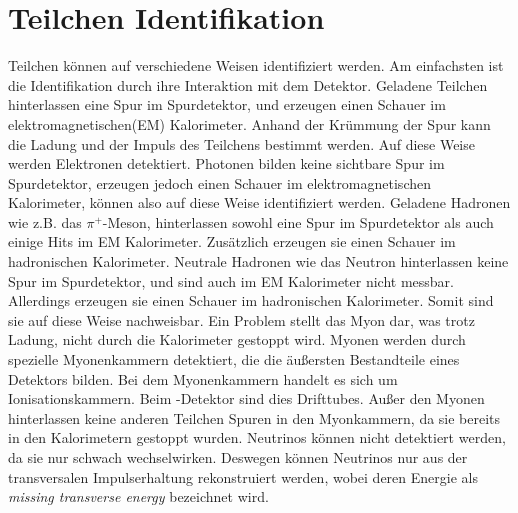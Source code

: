 \section{Teilchen Identifikation}
Teilchen können auf verschiedene Weisen identifiziert werden. Am einfachsten ist die Identifikation durch ihre Interaktion mit dem Detektor. Geladene Teilchen hinterlassen eine Spur im Spurdetektor, und erzeugen einen Schauer im elektromagnetischen(EM) Kalorimeter. Anhand der Krümmung der Spur kann die Ladung und der Impuls des Teilchens bestimmt werden. Auf diese Weise werden Elektronen detektiert. Photonen bilden keine sichtbare Spur im Spurdetektor, erzeugen jedoch einen Schauer im elektromagnetischen Kalorimeter, können also auf diese Weise identifiziert werden. Geladene Hadronen wie z.B. das $\pi^+$-Meson, hinterlassen sowohl eine Spur im Spurdetektor als auch einige Hits im EM Kalorimeter. Zusätzlich erzeugen sie einen Schauer im hadronischen Kalorimeter. Neutrale Hadronen wie das Neutron hinterlassen keine Spur im Spurdetektor, und sind auch im EM Kalorimeter nicht messbar. Allerdings erzeugen sie einen Schauer im hadronischen Kalorimeter. Somit sind sie auf diese Weise nachweisbar. Ein Problem stellt das Myon dar, was trotz Ladung, nicht durch die Kalorimeter gestoppt wird. Myonen werden durch spezielle Myonenkammern detektiert, die die äußersten Bestandteile eines Detektors bilden. Bei dem Myonenkammern handelt es sich um Ionisationskammern. Beim \atlas-Detektor sind dies Drifttubes. Außer den Myonen hinterlassen keine anderen Teilchen Spuren in den Myonkammern, da sie bereits in den Kalorimetern gestoppt wurden.
Neutrinos können nicht detektiert werden, da sie nur schwach wechselwirken. Deswegen können Neutrinos nur aus der transversalen Impulserhaltung rekonstruiert werden, wobei deren Energie als \emph{missing transverse energy} \MET bezeichnet wird.


